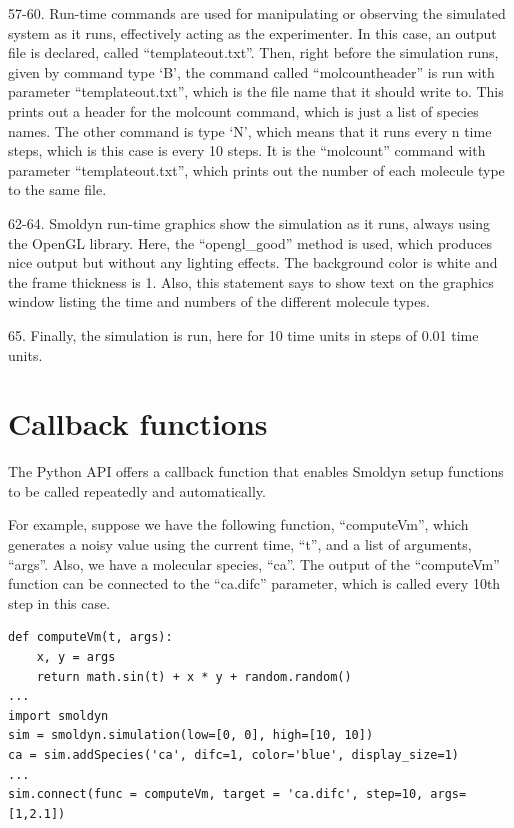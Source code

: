 \documentclass {scrbook}
\begin{document}
\begin{description}
\item{57-60.} Run-time commands are used for manipulating or observing the simulated system as it runs, effectively acting as the experimenter. In this case, an output file is declared, called ``templateout.txt''. Then, right before the simulation runs, given by command type `B', the command called ``molcountheader'' is run with parameter ``templateout.txt'', which is the file name that it should write to. This prints out a header for the molcount command, which is just a list of species names. The other command is type `N', which means that it runs every n time steps, which is this case is every 10 steps. It is the ``molcount'' command with parameter ``templateout.txt'', which prints out the number of each molecule type to the same file.

\item{62-64.} Smoldyn run-time graphics show the simulation as it runs, always using the OpenGL library. Here, the ``opengl\_good'' method is used, which produces nice output but without any lighting effects. The background color is white and the frame thickness is 1. Also, this statement says to show text on the graphics window listing the time and numbers of the different molecule types.

\item{65.} Finally, the simulation is run, here for 10 time units in steps of 0.01 time units.

\end{description}

\section{Callback functions}

The Python API offers a callback function that enables Smoldyn setup functions to be called repeatedly and automatically.

For example, suppose we have the following function, ``computeVm'', which generates a noisy value using the current time, ``t'', and a list of arguments, ``args''. Also, we have a molecular species, ``ca''. The output of the ``computeVm'' function can be connected to the ``ca.difc'' parameter, which is called every 10th step in this case.

\begin{lstlisting}[style=SSAPython]
def computeVm(t, args):
    x, y = args 
    return math.sin(t) + x * y + random.random()
...
import smoldyn
sim = smoldyn.simulation(low=[0, 0], high=[10, 10])
ca = sim.addSpecies('ca', difc=1, color='blue', display_size=1)
...
sim.connect(func = computeVm, target = 'ca.difc', step=10, args=[1,2.1])
\end{lstlisting}
\end{document}
